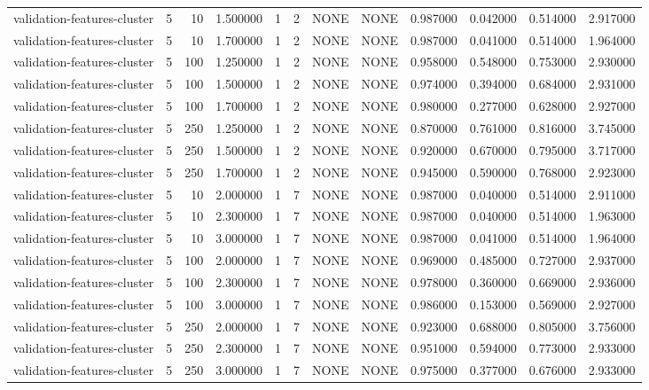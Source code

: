 \begin{tabular}{lrrrllllrrrr}
validation-features-cluster & 5 & 10 & 1.500000 & 1 & 2 & NONE & NONE & 0.987000 & 0.042000 & 0.514000 & 2.917000 \\
validation-features-cluster & 5 & 10 & 1.700000 & 1 & 2 & NONE & NONE & 0.987000 & 0.041000 & 0.514000 & 1.964000 \\
validation-features-cluster & 5 & 100 & 1.250000 & 1 & 2 & NONE & NONE & 0.958000 & 0.548000 & 0.753000 & 2.930000 \\
validation-features-cluster & 5 & 100 & 1.500000 & 1 & 2 & NONE & NONE & 0.974000 & 0.394000 & 0.684000 & 2.931000 \\
validation-features-cluster & 5 & 100 & 1.700000 & 1 & 2 & NONE & NONE & 0.980000 & 0.277000 & 0.628000 & 2.927000 \\
validation-features-cluster & 5 & 250 & 1.250000 & 1 & 2 & NONE & NONE & 0.870000 & 0.761000 & 0.816000 & 3.745000 \\
validation-features-cluster & 5 & 250 & 1.500000 & 1 & 2 & NONE & NONE & 0.920000 & 0.670000 & 0.795000 & 3.717000 \\
validation-features-cluster & 5 & 250 & 1.700000 & 1 & 2 & NONE & NONE & 0.945000 & 0.590000 & 0.768000 & 2.923000 \\
validation-features-cluster & 5 & 10 & 2.000000 & 1 & 7 & NONE & NONE & 0.987000 & 0.040000 & 0.514000 & 2.911000 \\
validation-features-cluster & 5 & 10 & 2.300000 & 1 & 7 & NONE & NONE & 0.987000 & 0.040000 & 0.514000 & 1.963000 \\
validation-features-cluster & 5 & 10 & 3.000000 & 1 & 7 & NONE & NONE & 0.987000 & 0.041000 & 0.514000 & 1.964000 \\
validation-features-cluster & 5 & 100 & 2.000000 & 1 & 7 & NONE & NONE & 0.969000 & 0.485000 & 0.727000 & 2.937000 \\
validation-features-cluster & 5 & 100 & 2.300000 & 1 & 7 & NONE & NONE & 0.978000 & 0.360000 & 0.669000 & 2.936000 \\
validation-features-cluster & 5 & 100 & 3.000000 & 1 & 7 & NONE & NONE & 0.986000 & 0.153000 & 0.569000 & 2.927000 \\
validation-features-cluster & 5 & 250 & 2.000000 & 1 & 7 & NONE & NONE & 0.923000 & 0.688000 & 0.805000 & 3.756000 \\
validation-features-cluster & 5 & 250 & 2.300000 & 1 & 7 & NONE & NONE & 0.951000 & 0.594000 & 0.773000 & 2.933000 \\
validation-features-cluster & 5 & 250 & 3.000000 & 1 & 7 & NONE & NONE & 0.975000 & 0.377000 & 0.676000 & 2.933000 \\

\end{tabular}
